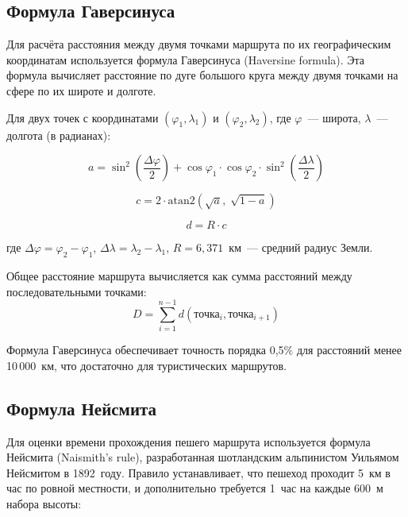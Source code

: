 \subsection{Формула Гаверсинуса}

Для расчёта расстояния между двумя точками маршрута по их географическим координатам используется формула Гаверсинуса (Haversine formula). Эта формула вычисляет расстояние по дуге большого круга между двумя точками на сфере по их широте и долготе.

Для двух точек с координатами $(\varphi_1, \lambda_1)$ и $(\varphi_2, \lambda_2)$, где $\varphi$~--- широта, $\lambda$~--- долгота (в радианах):

\begin{equation}
  a = \sin^2\!\left(\frac{\Delta\varphi}{2}\right) + \cos\varphi_1 \cdot \cos\varphi_2 \cdot \sin^2\!\left(\frac{\Delta\lambda}{2}\right)
\end{equation}

\begin{equation}
  c = 2 \cdot \mathrm{atan2}\!\left(\sqrt{a},\;\sqrt{1 - a}\right)
\end{equation}

\begin{equation}
  d = R \cdot c
\end{equation}

где $\Delta\varphi = \varphi_2 - \varphi_1$, $\Delta\lambda = \lambda_2 - \lambda_1$, $R = 6{,}371$~км~--- средний радиус Земли.

Общее расстояние маршрута вычисляется как сумма расстояний между последовательными точками:
\begin{equation}
  D = \sum_{i=1}^{n-1} d(\text{точка}_i, \text{точка}_{i+1})
\end{equation}

Формула Гаверсинуса обеспечивает точность порядка 0,5\% для расстояний менее 10\,000~км, что достаточно для туристических маршрутов.

\subsection{Формула Нейсмита}

Для оценки времени прохождения пешего маршрута используется формула Нейсмита (Naismith's rule), разработанная шотландским альпинистом Уильямом Нейсмитом в 1892~году. Правило устанавливает, что пешеход проходит 5~км в час по ровной местности, и дополнительно требуется 1~час на каждые 600~м набора высоты:


